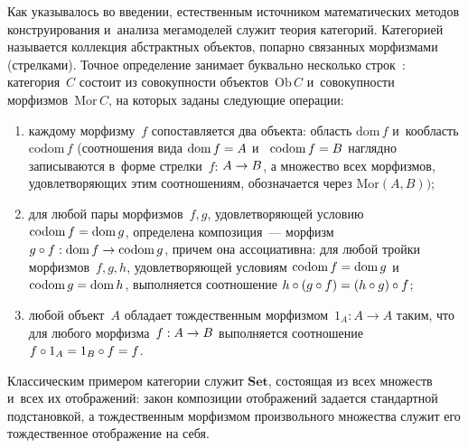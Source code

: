 \begin{multicols}{2}
   Как указывалось во введении, естественным источни\-ком математических 
методов кон\-стру\-ирова\-ния и~анализа мегамоделей служит теория категорий. 
Категорией называется коллекция абстрактных объектов, попарно связанных 
морфизмами (стрелками). Точное определение занимает буквально несколько 
строк~\cite{14-kov}: категория~$C$ состоит из совокупности 
объектов~$\mathrm{Ob}\,C$ и~совокупности морфизмов~$\mathrm{Mor}\,C$, 
на которых заданы следующие операции:
\begin{enumerate}[(1)]
\item каждому морфизму~$f$ 
сопоставляется два объекта: область $\mathrm{dom}\,f$ и~кообласть 
$\mathrm{codom}\,f$ (соотношения вида $\mathrm{dom}\,f \hm= A$ и~
$\mathrm{codom}\,f \hm= B$ наглядно записываются в~форме стрелки~$f$: 
$A\hm\to B$, а множество всех морфизмов, удовлетворяющих этим 
соотношениям, обозначается через $\mathrm{Mor}(A, B))$;
\item для 
любой пары морфизмов~$f, g$, удовлетворяющей условию 
$\mathrm{codom}\,f\hm = \mathrm{dom}\,g$, определена композиция~--- 
морфизм $g \circ f : \mathrm{dom}\,f \hm\to  \mathrm{codom}\,g$, причем она 
ассоциативна: для любой тройки морфизмов~$f, g, h$, удовлетворяющей 
условиям $\mathrm{codom}\,f \hm= \mathrm{dom}\,g$ и~$\mathrm{codom}\,g 
\hm= \mathrm{dom}\,h$, выполняется соотношение $h \circ (g \circ f) \hm= (h 
\circ g) \circ f$;
\item любой объект~$A$ обладает тождественным 
морфизмом~$1_A : A \to A$ таким, что для любого морфизма~$f : A\hm\to B$ 
выполняется соотношение $f \circ 1_A \hm= 1_B \circ  f \hm= f$.
\end{enumerate}

Классическим 
примером категории служит $\mathbf{Set}$, состоящая из всех множеств и~всех 
их отображений: закон композиции отображений задается стандартной 
подстановкой, а тождественным морфизмом произвольного множества служит 
его тождественное отображение на себя.
   

\end{multicols}
